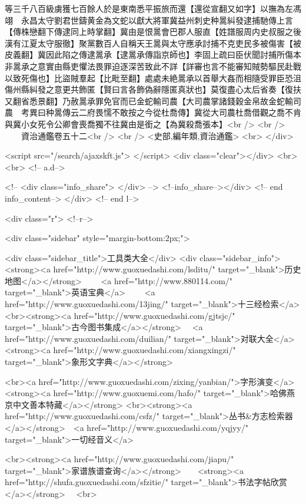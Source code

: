 等三千八百級虜獲七百餘人於是東南悉平振旅而還【還從宣翻又如字】以撫為左馮翊　永昌太守劉君世鑄黄金為文蛇以獻大將軍冀益州刺史种暠糾發逮捕馳傳上言【傳株戀翻下傳逮同上時掌翻】冀由是恨暠會巴郡人服直【姓譜服周内史叔服之後漢有江夏太守服徹】聚黨數百人自稱天王暠與太守應承討捕不克吏民多被傷害【被皮義翻】冀因此陷之傳逮暠承【逮暠承傳詣京師也】李固上疏曰臣伏聞討捕所傷本非暠承之意實由縣吏懼法畏罪迫逐深苦致此不詳【詳審也言不能審知賊勢驅民赴戰以致死傷也】比盜賊羣起【比毗至翻】處處未絶暠承以首舉大姦而相隨受罪臣恐沮傷州縣糾發之意更共飾匿【賢曰言各飾偽辭隱匿真狀也】莫復盡心太后省奏【復扶又翻省悉景翻】乃赦暠承罪免官而已金蛇輸司農【大司農掌諸錢穀金帛故金蛇輸司農　考異曰种暠傳云二府畏懦不敢按之今從杜喬傳】冀從大司農杜喬借觀之喬不肯與冀小女死令公卿會喪喬獨不往冀由是銜之【為冀殺喬張本】<br />
<br />
　　資治通鑑卷五十二<br />
<br />
<史部,編年類,資治通鑑>  <br>
   </div> 

<script src="/search/ajaxskft.js"> </script>
 <div class="clear"></div>
<br>
<br>
 <!-- a.d-->

 <!--
<div class="info_share">
</div> 
-->
 <!--info_share--></div>   <!-- end info_content-->
  </div> <!-- end l-->

<div class="r">   <!--r-->



<div class="sidebar"  style="margin-bottom:2px;">

 
<div class="sidebar_title">工具类大全</div>
<div class="sidebar_info">
<strong><a href="http://www.guoxuedashi.com/lsditu/" target="_blank">历史地图</a></strong>　　
<a href="http://www.880114.com/" target="_blank">英语宝典</a>　　
<a href="http://www.guoxuedashi.com/13jing/" target="_blank">十三经检索</a>　
<br><strong><a href="http://www.guoxuedashi.com/gjtsjc/" target="_blank">古今图书集成</a></strong>　
<a href="http://www.guoxuedashi.com/duilian/" target="_blank">对联大全</a>　<strong><a href="http://www.guoxuedashi.com/xiangxingzi/" target="_blank">象形文字典</a></strong>　

<br><a href="http://www.guoxuedashi.com/zixing/yanbian/">字形演变</a>　　<strong><a href="http://www.guoxuemi.com/hafo/" target="_blank">哈佛燕京中文善本特藏</a></strong>
<br><strong><a href="http://www.guoxuedashi.com/csfz/" target="_blank">丛书&方志检索器</a></strong>　<a href="http://www.guoxuedashi.com/yqjyy/" target="_blank">一切经音义</a>　　

<br><strong><a href="http://www.guoxuedashi.com/jiapu/" target="_blank">家谱族谱查询</a></strong>　　<strong><a href="http://shufa.guoxuedashi.com/sfzitie/" target="_blank">书法字帖欣赏</a></strong>　
<br>

